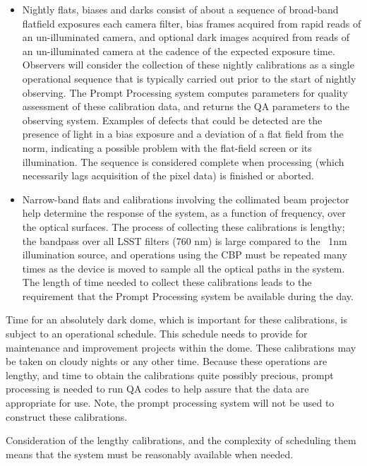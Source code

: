 \begin{itemize}

\item Nightly flats, biases and darks consist of about a sequence of  broad-band
flatfield exposures each camera filter, bias frames acquired from
rapid reads of an un-illuminated camera, and optional dark images
acquired from reads of an un-illuminated camera at the cadence of the
expected exposure time.  Observers will consider the collection of
these nightly calibrations as a single operational sequence that is
typically carried out prior to the start of nightly observing.  The
Prompt Processing system computes parameters for quality assessment of
these calibration data, and returns the QA parameters to the observing
system.  Examples of defects that could be detected are the presence
of light in a bias exposure and a deviation of a flat field from the
norm, indicating a possible problem with the flat-field screen or its
illumination.  The sequence is considered complete when processing
(which necessarily lags acquisition of the pixel data) is finished or
aborted.

\item Narrow-band flats and calibrations involving the collimated beam
projector help determine the response of the system, as a function of
frequency, over the optical surfaces.  The process of collecting these
calibrations is lengthy; the bandpass over all LSST filters (760 nm)
is large compared to the ~1nm illumination source, and operations
using the CBP must be repeated many times as the device is moved to
sample all the optical paths in the system.  The length of time needed
to collect these calibrations leads to the requirement that the Prompt
Processing system be available during the day. \\

\end{itemize}

Time for an absolutely dark dome, which is important for these
calibrations, is subject to an operational schedule.  This schedule
needs to provide for maintenance and improvement projects within the
dome.  These calibrations may be taken on cloudy nights or any other
time.  Because these operations are lengthy, and time to obtain the
calibrations quite possibly precious, prompt processing is needed to
run QA codes to help assure that the data are appropriate for
use. Note, the prompt processing system will not be used to construct
these calibrations.

Consideration of the lengthy calibrations, and the complexity of
scheduling them means that the system must be reasonably available
when needed.


